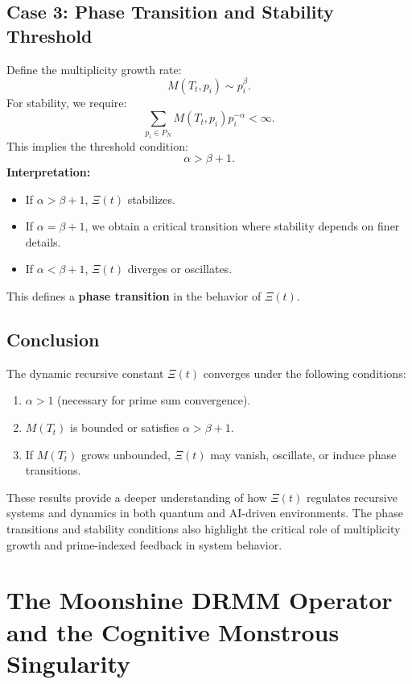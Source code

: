 \documentclass[12pt]{article}
\begin{document}
\subsection{Case 3: Phase Transition and Stability Threshold}
Define the multiplicity growth rate:
\begin{equation}
    M(T_t, p_i) \sim p_i^{\beta}.
\end{equation}
For stability, we require:
\begin{equation}
    \sum_{p_i \in P_N} M(T_t, p_i) p_i^{-\alpha} < \infty.
\end{equation}
This implies the threshold condition:
\begin{equation}
    \alpha > \beta + 1.
\end{equation}
\textbf{Interpretation:}
\begin{itemize}
    \item If \( \alpha > \beta + 1 \), \(\Xi(t) \) stabilizes.
    \item If \( \alpha = \beta + 1 \), we obtain a critical transition where stability depends on finer details.
    \item If \( \alpha < \beta + 1 \), \(\Xi(t) \) diverges or oscillates.
\end{itemize}
This defines a \textbf{phase transition} in the behavior of \(\Xi(t) \).

\subsection{Conclusion}
The dynamic recursive constant \(\Xi(t) \) converges under the following conditions:
\begin{enumerate}
    \item \( \alpha > 1 \) (necessary for prime sum convergence).
    \item \( M(T_t) \) is bounded or satisfies \( \alpha > \beta + 1 \).
    \item If \( M(T_t) \) grows unbounded, \(\Xi(t) \) may vanish, oscillate, or induce phase transitions.
\end{enumerate}
These results provide a deeper understanding of how \(\Xi(t) \) regulates recursive systems and dynamics in both quantum and AI-driven environments. The phase transitions and stability conditions also highlight the critical role of multiplicity growth and prime-indexed feedback in system behavior.

\section{The Moonshine DRMM Operator and the Cognitive Monstrous Singularity}
\end{document}
